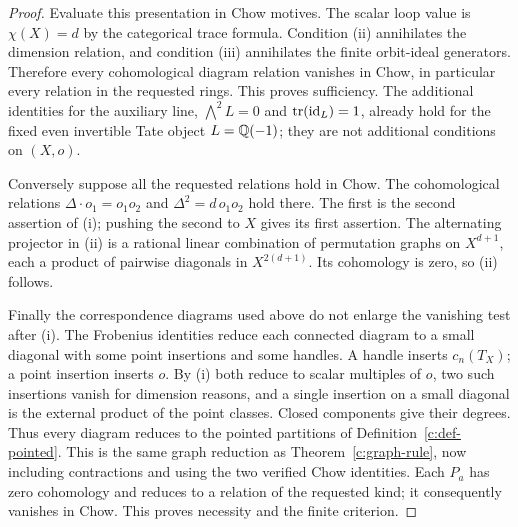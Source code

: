\begin{proof}
Evaluate this presentation in Chow motives.  The scalar loop value
is $\chi(X)=d$ by the categorical trace formula.  Condition (ii)
annihilates the dimension relation, and condition (iii) annihilates
the finite orbit-ideal generators.  Therefore every cohomological
diagram relation vanishes in Chow, in particular every relation in
the requested rings.  This proves sufficiency.
The additional identities for the auxiliary line,
$\bigwedge^2 L=0$ and $\operatorname{tr}(\operatorname{id}_L)=1$, already hold
for the fixed even invertible Tate object $L=\mathbb Q(-1)$; they are
not additional conditions on $(X,o)$.

Conversely suppose all the requested relations hold in Chow.
The cohomological relations
$\Delta\cdot o_1=o_1o_2$ and
$\Delta^2=d\,o_1o_2$ hold there.  The first is the second assertion
of (i); pushing the second to $X$ gives its first assertion.
The alternating projector in (ii) is a rational linear combination
of permutation graphs on $X^{d+1}$, each a product of pairwise
diagonals in $X^{2(d+1)}$.  Its cohomology is zero, so (ii) follows.

Finally the correspondence diagrams used above do not enlarge the
vanishing test after (i).  The Frobenius identities reduce each
connected diagram to a small diagonal with some point insertions
and some handles.  A handle inserts $c_n(T_X)$; a point insertion
inserts $o$.  By (i) both reduce to scalar multiples of $o$, two
such insertions vanish for dimension reasons, and a single insertion
on a small diagonal is the external product of the point classes.
Closed components give their degrees.  Thus every diagram reduces
to the pointed partitions of Definition~\ref{c:def-pointed}.
This is the same graph reduction as Theorem~\ref{c:graph-rule},
now including contractions and using the two verified Chow
identities.  Each $P_a$ has zero cohomology and reduces to a relation
of the requested kind; it consequently vanishes in Chow.  This
proves necessity and the finite criterion.
\end{proof}

